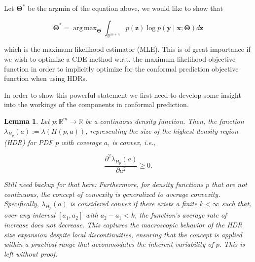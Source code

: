 \documentclass{article}
\DeclareMathOperator*{\argmax}{arg\,max}
\newtheorem{lemma}[theorem]{Lemma}
\theoremstyle{definition}
\begin{document}
Let $\mathbf{\Theta^*}$ be the argmin of the equation above, we would like to show that

$$\mathbf{\Theta^*} = \argmax_{\mathbf{\Theta}}  \int_{\mathbb{R}^{m + n}} p(\mathbf{z}) \log p(\mathbf{y} \mid \mathbf{x}; \mathbf{\Theta}) d \mathbf{z}$$

which is the maximum likelihood estimator (MLE). This is of great importance if we wish to optimize a CDE method w.r.t. the maximum likelihood objective function in order to implicitly optimize for the conformal prediction objective function when using HDRs.

In order to show this powerful statement we first need to develop some insight into the workings of the components in conformal prediction.


\begin{lemma}
Let \(p: \mathbb{R}^m \to \mathbb{R}\) be a continuous density function. Then, the function \(\lambda_{H_p}(a) := \lambda(H(p, a))\), representing the size of the highest density region (HDR) for PDF \(p\) with coverage \(a\), is convex, i.e.,

\[\frac{\partial^2 \lambda_{H_p}(a)}{\partial a^2} \geq 0.\]

Still need backup for that here: Furthermore, for density functions \( p \) that are not continuous, the concept of convexity is generalized to average convexity. Specifically, \( \lambda_{H_p}(a) \) is considered convex if there exists a finite \( k < \infty \) such that, over any interval \( [a_1, a_2] \) with \( a_2 - a_1 < k \), the function's average rate of increase does not decrease. This captures the macroscopic behavior of the HDR size expansion despite local discontinuities, ensuring that the concept is applied within a practical range that accommodates the inherent variability of \( p \). This is left without proof.

\end{lemma}
\end{document}
